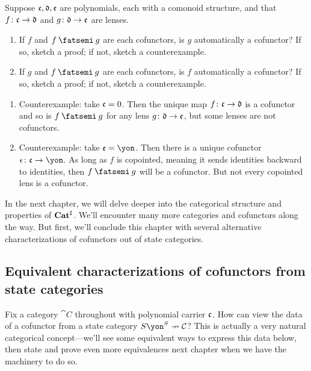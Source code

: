 \documentclass[Book-Poly]{subfiles}
\begin{document}
\begin{exercise}
Suppose $\mathfrak{c},\mathfrak{d},\mathfrak{e}$ are polynomials, each with a comonoid structure, and that $f\colon\mathfrak{c}\to\mathfrak{d}$ and $g\colon\mathfrak{d}\to\mathfrak{e}$ are lenses.
\begin{enumerate}
	\item If $f$ and $f\then g$ are each cofunctors, is $g$ automatically a cofunctor?
	If so, sketch a proof; if not, sketch a counterexample.
	\item If $g$ and $f\then g$ are each cofunctors, is $f$ automatically a cofunctor?
	If so, sketch a proof; if not, sketch a counterexample.
\qedhere
\end{enumerate}
\begin{solution}
\begin{enumerate}
    \item Counterexample: take $\mathfrak{c}=0$. Then the unique map $f\colon\mathfrak{c}\to\mathfrak{d}$ is a cofunctor and so is $f\then g$ for any lens $g\colon\mathfrak{d}\to\mathfrak{e}$, but some lenses are not cofunctors.
    \item Counterexample: take $\car{e}=\yon$. Then there is a unique cofunctor $\epsilon\colon\car{c}\to\yon$. As long as $f$ is copointed, meaning it sends identities backward to identities, then $f\then g$ will be a cofunctor. But not every copointed lens is a cofunctor.
\end{enumerate}
\end{solution}
\end{exercise}

In the next chapter, we will delve deeper into the categorical structure and properties of $\mathbf{Cat}^\sharp$.
We'll encounter many more categories and cofunctors along the way.
But first, we'll conclude this chapter with several alternative characterizations of cofunctors out of state categories.

\subsection{Equivalent characterizations of cofunctors from state categories} \label{sec.comon.sharp.cof.from_state}

Fix a category $\cat{C}$ throughout with polynomial carrier $\mathfrak{c}$.
How can view the data of a cofunctor from a state category $S\yon^S\cof\cat{C}$?
This is actually a very natural categorical concept---we'll see some equivalent ways to express this data below, then state and prove even more equivalences next chapter when we have the machinery to do so.
\end{document}
